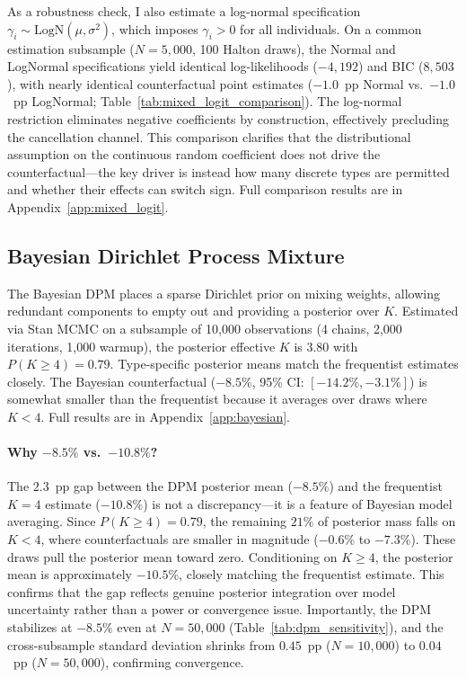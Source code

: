 \documentclass[12pt]{article}
\begin{document}
As a robustness check, I also estimate a log-normal specification $\gamma_i \sim \text{LogN}(\mu, \sigma^2)$, which imposes $\gamma_i > 0$ for all individuals. On a common estimation subsample ($N = 5{,}000$, 100 Halton draws), the Normal and LogNormal specifications yield identical log-likelihoods ($-4{,}192$) and BIC ($8{,}503$), with nearly identical counterfactual point estimates ($-1.0$~pp Normal vs.\ $-1.0$~pp LogNormal; Table~\ref{tab:mixed_logit_comparison}). The log-normal restriction eliminates negative coefficients by construction, effectively precluding the cancellation channel. This comparison clarifies that the distributional assumption on the continuous random coefficient does not drive the counterfactual---the key driver is instead how many discrete types are permitted and whether their effects can switch sign. Full comparison results are in Appendix~\ref{app:mixed_logit}.

\subsection{Bayesian Dirichlet Process Mixture}

The Bayesian DPM \citep{malsiner2016} places a sparse Dirichlet prior on mixing weights, allowing redundant components to empty out and providing a posterior over $K$. Estimated via Stan MCMC on a subsample of 10,000 observations (4 chains, 2,000 iterations, 1,000 warmup), the posterior effective $K$ is 3.80 with $P(K \geq 4) = 0.79$. Type-specific posterior means match the frequentist estimates closely. The Bayesian counterfactual ($-8.5\%$, 95\% CI: $[-14.2\%, -3.1\%]$) is somewhat smaller than the frequentist because it averages over draws where $K < 4$. Full results are in Appendix~\ref{app:bayesian}.

\paragraph{Why $-8.5\%$ vs.\ $-10.8\%$?} The $2.3$~pp gap between the DPM posterior mean ($-8.5\%$) and the frequentist $K=4$ estimate ($-10.8\%$) is not a discrepancy---it is a feature of Bayesian model averaging. Since $P(K \geq 4) = 0.79$, the remaining $21\%$ of posterior mass falls on $K < 4$, where counterfactuals are smaller in magnitude ($-0.6\%$ to $-7.3\%$). These draws pull the posterior mean toward zero. Conditioning on $K \geq 4$, the posterior mean is approximately $-10.5\%$, closely matching the frequentist estimate. This confirms that the gap reflects genuine posterior integration over model uncertainty rather than a power or convergence issue. Importantly, the DPM stabilizes at $-8.5\%$ even at $N = 50{,}000$ (Table~\ref{tab:dpm_sensitivity}), and the cross-subsample standard deviation shrinks from $0.45$~pp ($N = 10{,}000$) to $0.04$~pp ($N = 50{,}000$), confirming convergence.
\end{document}
